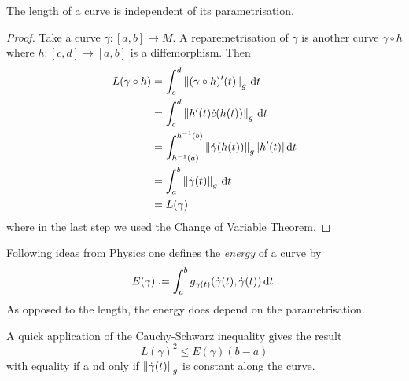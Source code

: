\documentclass[12pt,twoside]{book}
\begin{document}
\begin{proposition}
	The length of a curve is independent of its parametrisation.
\end{proposition}
\begin{proof}
	Take a curve \( \gamma \colon [a,b] \to M \). A reparemetrisation of \( \gamma \) is
	another curve \( \gamma \circ h \) where \( h \colon [c,d] \to [a,b] \) is a
	diffemorphism. Then
	\begin{align*}
		L(\gamma \circ h) &= \int_{c}^d \left\lVert (\gamma \circ h)'(t) \right\rVert_g \, \mathrm{d} t \\
											&= \int_c^d \left\lVert h'(t) \dot{c}(h(t)) \right\rVert_g \, \mathrm{d} t \\
											& = \int_{h^{-1}(a)}^{h^{-1}(b)} \left\lVert \dot{\gamma}(h(t)) \right\rVert_g
											\lvert h'(t) \rvert \, \mathrm{d} t \\
											& = \int_a^b \left\lVert \dot{\gamma}(t) \right\rVert_g \, \mathrm{d} t \\
											& = L(\gamma)
	\end{align*}
	where in the last step we used the Change of Variable Theorem.
\end{proof}

\begin{definition}
	Following ideas from Physics one defines the \emph{energy} of a curve by
	\begin{equation*}
		E(\gamma) \defeq \int_a^b g_{\gamma(t)}(\dot{\gamma}(t), \dot{\gamma}(t)) \ud t.
	\end{equation*}
	As opposed to the length, the energy does depend on the parametrisation. 
\end{definition}
A quick application of the Cauchy-Schwarz inequality gives the result
\begin{equation*}
	L(\gamma)^2 \leq E(\gamma)(b - a)
\end{equation*}
with equality if a nd only if \( \left\lVert \dot{\gamma}(t) \right\rVert_g \) is constant along the curve.
\end{document}
